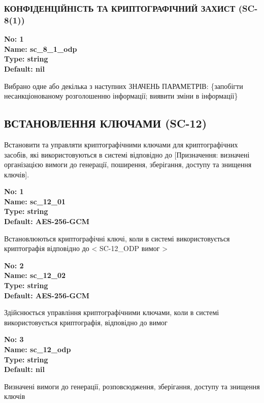 \documentclass{article}
\begin{document}
\subsubsection{КОНФІДЕНЦІЙНІСТЬ ТА КРИПТОГРАФІЧНИЙ ЗАХИСТ (SC-8(1))}


\vspace{10pt}
{\footnotesize\bfseries
No: 1\\
Name: sc\_8\_1\_odp\\
Type: string\\
Default: nil
}

{\footnotesize Вибрано одне або декілька з наступних ЗНАЧЕНЬ ПАРАМЕТРІВ: \{запобігти несанкціонованому розголошенню інформації; виявити зміни в інформації\}}




\subsection{ВСТАНОВЛЕННЯ КЛЮЧАМИ (SC-12)}
Встановити та управляти криптографічними ключами для криптографічних засобів, які використовуються в системі відповідно до [Призначення: визначені організацією вимоги до генерації, поширення, зберігання, доступу та знищення ключів].

\vspace{10pt}
{\footnotesize\bfseries
No: 1\\
Name: sc\_12\_01\\
Type: string\\
Default: \textquotedbl{}AES-256-GCM\textquotedbl{}
}

{\footnotesize Встановлюються криптографічні ключі, коли в системі використовується криптографія відповідно до < SC-12\_ODP вимог >}


{\footnotesize\bfseries
No: 2\\
Name: sc\_12\_02\\
Type: string\\
Default: \textquotedbl{}AES-256-GCM\textquotedbl{}
}

{\footnotesize Здійснюється управління криптографічними ключами, коли в системі використовується криптографія, відповідно до вимог }


{\footnotesize\bfseries
No: 3\\
Name: sc\_12\_odp\\
Type: string\\
Default: nil
}

{\footnotesize Визначені вимоги до генерації, розповсюдження, зберігання, доступу та знищення ключів}
\end{document}
